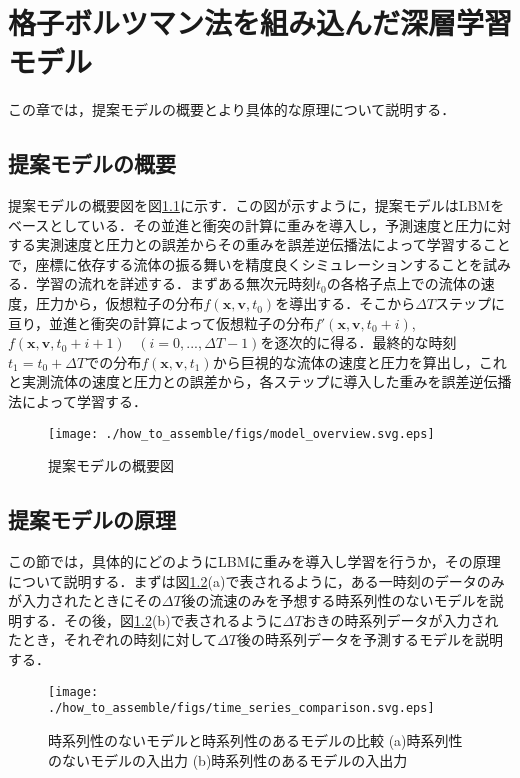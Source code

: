\chapter{格子ボルツマン法を組み込んだ深層学習モデル\label{chap:how-to-assemble}}
この章では，提案モデルの概要とより具体的な原理について説明する．

\section{提案モデルの概要}
提案モデルの概要図を図\ref{fig:overview}に示す．この図が示すように，提案モデルはLBMをベースとしている．その並進と衝突の計算に重みを導入し，予測速度と圧力に対する実測速度と圧力との誤差からその重みを誤差逆伝播法によって学習することで，座標に依存する流体の振る舞いを精度良くシミュレーションすることを試みる．学習の流れを詳述する．まずある無次元時刻$t_0$の各格子点上での流体の速度，圧力から，仮想粒子の分布$f(\bm{x}, \bm{v}, t_0)$を導出する．そこから$\Delta T$ステップに亘り，並進と衝突の計算によって仮想粒子の分布$f'(\bm{x}, \bm{v}, t_0+i)$, $f(\bm{x}, \bm{v}, t_0+i+1) \hspace{10pt}(i=0,...,\Delta T - 1)$を逐次的に得る．最終的な時刻$t_1 = t_0 + \Delta T$での分布$f(\bm{x}, \bm{v}, t_1)$から巨視的な流体の速度と圧力を算出し，これと実測流体の速度と圧力との誤差から，各ステップに導入した重みを誤差逆伝播法によって学習する．
\begin{figure}[tbp]
  \centering
  \texttt{[image: ./how\_to\_assemble/figs/model\_overview.svg.eps]}
  \caption{提案モデルの概要図}
  \label{fig:overview}
\end{figure}

\section{提案モデルの原理}
この節では，具体的にどのようにLBMに重みを導入し学習を行うか，その原理について説明する．まずは図\ref{fig:model-comparison}(a)で表されるように，ある一時刻のデータのみが入力されたときにその$\Delta T$後の流速のみを予想する時系列性のないモデルを説明する．その後，図\ref{fig:model-comparison}(b)で表されるように$\Delta T$おきの時系列データが入力されたとき，それぞれの時刻に対して$\Delta T$後の時系列データを予測するモデルを説明する．

\begin{figure}[tbp]
  \centering
  \texttt{[image: ./how\_to\_assemble/figs/time\_series\_comparison.svg.eps]}
  \caption{時系列性のないモデルと時系列性のあるモデルの比較 (a)時系列性のないモデルの入出力 (b)時系列性のあるモデルの入出力}
  \label{fig:model-comparison}
\end{figure}


